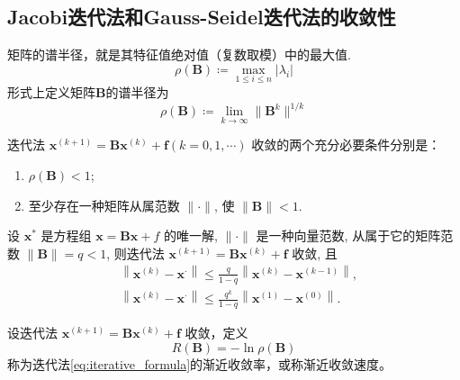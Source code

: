 \subsection{Jacobi迭代法和Gauss-Seidel迭代法的收敛性}
矩阵的谱半径，就是其特征值绝对值（复数取模）中的最大值.
\[
    \rho(\boldsymbol{B})\coloneqq \max_{1\le i\le n}|\lambda_i|
\]
形式上定义矩阵$\boldsymbol{B}$的谱半径为
\[
    \rho(\boldsymbol{B})\coloneqq \lim_{k\to\infty}\lVert \boldsymbol{B}^k\rVert^{1/k}
\]
\begin{theorem}[迭代法收敛的充要条件]\label{theorem:iterative_method_convergence}
    迭代法 $\boldsymbol{x}^{(k+1)}=\boldsymbol{B} \boldsymbol{x}^{(k)}+\boldsymbol{f}(k=0,1, \cdots)$ 收敛的两个充分必要条件分别是：
    \begin{enumerate}
        \item $\rho(\boldsymbol{B})<1$;
        \item 至少存在一种矩阵从属范数 $\|\cdot\|$, 使 $\|\boldsymbol{B}\|<1$.
    \end{enumerate}
\end{theorem}
\begin{theorem}[迭代法的误差估计]
    设 $\boldsymbol{x}^*$ 是方程组 $\boldsymbol{x}=\boldsymbol{B} \boldsymbol{x}+f$ 的唯一解, $\|\cdot\|$ 是一种向量范数, 从属于它的矩阵范数 $\|\boldsymbol{B}\|=q<1$, 则迭代法 $\boldsymbol{x}^{(k+1)}=\boldsymbol{B} \boldsymbol{x}^{(k)}+\boldsymbol{f}$ 收敛, 且
    \[
        \begin{aligned}
             & \left\|\boldsymbol{x}^{(k)}-\boldsymbol{x}^{\cdot}\right\| \leqslant \frac{q}{1-q}\left\|\boldsymbol{x}^{(k)}-\boldsymbol{x}^{(k-1)}\right\|,  \\
             & \left\|\boldsymbol{x}^{(k)}-\boldsymbol{x}^{\cdot}\right\| \leqslant \frac{q^k}{1-q}\left\|\boldsymbol{x}^{(1)}-\boldsymbol{x}^{(0)}\right\| .
        \end{aligned}
    \]
\end{theorem}
\begin{definition}
    设迭代法 $\boldsymbol{x}^{(k+1)}=\boldsymbol{B} \boldsymbol{x}^{(k)}+\boldsymbol{f}$ 收敛，定义
    \[
        R(\boldsymbol{B})=-\ln \rho(\boldsymbol{B})
    \]
    称为迭代法\ref{eq:iterative_formula}的渐近收敛率，或称渐近收敛速度。
\end{definition}

